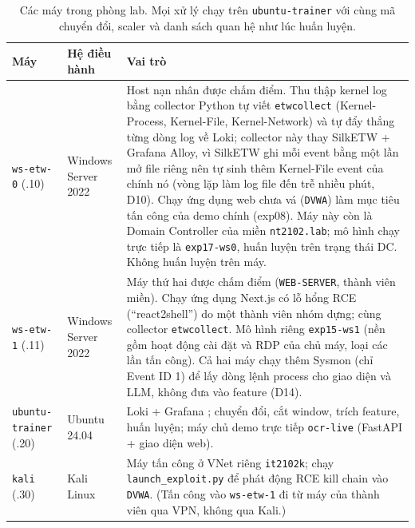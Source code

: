 \begin{table}[H]
\centering
\small
\begin{tabularx}{\textwidth}{l l X}
\toprule
\textbf{Máy} & \textbf{Hệ điều hành} & \textbf{Vai trò} \\
\midrule
\texttt{ws-etw-0} (.10) & Windows Server 2022 & Host nạn nhân được chấm điểm. Thu thập kernel log bằng collector Python tự viết \texttt{etwcollect} (Kernel-Process, Kernel-File, Kernel-Network) và tự đẩy thẳng từng dòng log về Loki; collector này thay SilkETW \cite{silketw} + Grafana Alloy, vì SilkETW ghi mỗi event bằng một lần mở file riêng nên tự sinh thêm Kernel-File event của chính nó (vòng lặp làm log file đến trễ nhiều phút, D10). Chạy ứng dụng web chưa vá (\texttt{DVWA}) làm mục tiêu tấn công của demo chính (exp08). Máy này còn là Domain Controller của miền \texttt{nt2102.lab}; mô hình chạy trực tiếp là \texttt{exp17-ws0}, huấn luyện trên trạng thái DC. Không huấn luyện trên máy. \\
\texttt{ws-etw-1} (.11) & Windows Server 2022 & Máy thứ hai được chấm điểm (\texttt{WEB-SERVER}, thành viên miền). Chạy ứng dụng Next.js có lỗ hổng RCE (``react2shell'') do một thành viên nhóm dựng; cùng collector \texttt{etwcollect}. Mô hình riêng \texttt{exp15-ws1} (nền gồm hoạt động cài đặt và RDP của chủ máy, loại các lần tấn công). Cả hai máy chạy thêm Sysmon (chỉ Event ID 1) để lấy dòng lệnh process cho giao diện và LLM, không đưa vào feature (D14). \\
\texttt{ubuntu-trainer} (.20) & Ubuntu 24.04 & Loki + Grafana \cite{grafana_loki}; chuyển đổi, cắt window, trích feature, huấn luyện; máy chủ demo trực tiếp \texttt{ocr-live} (FastAPI + giao diện web). \\
\texttt{kali} (.30) & Kali Linux & Máy tấn công ở VNet riêng \texttt{it2102k}; chạy \texttt{launch\_exploit.py} để phát động RCE kill chain vào \texttt{DVWA}. (Tấn công vào \texttt{ws-etw-1} đi từ máy của thành viên qua VPN, không qua Kali.) \\
\bottomrule
\end{tabularx}
\caption{Các máy trong phòng lab. Mọi xử lý chạy trên \texttt{ubuntu-trainer} với cùng mã chuyển đổi, scaler và danh sách quan hệ như lúc huấn luyện.}
\label{tab:vms}
\end{table}

